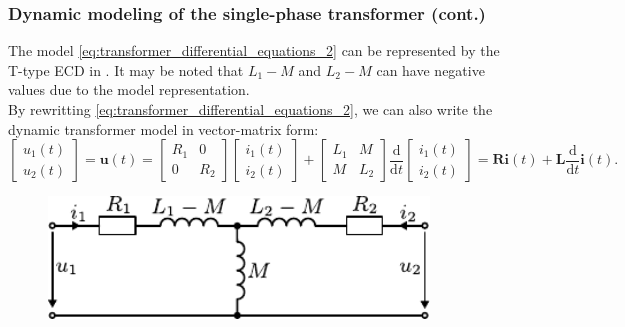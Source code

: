 \begin{frame}
	\frametitle{Dynamic modeling of the single-phase transformer (cont.)}
		The model \eqref{eq:transformer_differential_equations_2} can be represented by the T-type ECD in . It may be noted that $L_1-M$ and $L_2-M$ can have negative values due to the model representation. 
		\\[1em]
		By rewritting \eqref{eq:transformer_differential_equations_2}, we can also write the dynamic transformer model in vector-matrix form:
		\begin{equation}
			\begin{bmatrix}	u_1(t)\\u_2(t) \end{bmatrix} = \bm{u}(t) = \begin{bmatrix} R_1 & 0 \\ 0 & R_2 \end{bmatrix} \begin{bmatrix} i_1(t)\\i_2(t) \end{bmatrix} + \begin{bmatrix} L_1 & M \\ M & L_2 \end{bmatrix} \frac{\mathrm{d}}{\mathrm{d}t} \begin{bmatrix} i_1(t)\\i_2(t) \end{bmatrix} = \bm{R}\bm{i}(t) + \bm{L}\frac{\mathrm{d}}{\mathrm{d}t}\bm{i}(t).  
			\label{eq:transformer_differential_equations_matrix_form}
		\end{equation}
\begin{figure}
\begin{columns}
	\begin{column}{0.55\textwidth}
            \centering
            \includegraphics[width=0.9\textwidth]{fig/lec04/Transformer_T_ECD.pdf}
    \end{column}
\end{columns}
\end{figure}
\end{frame}

